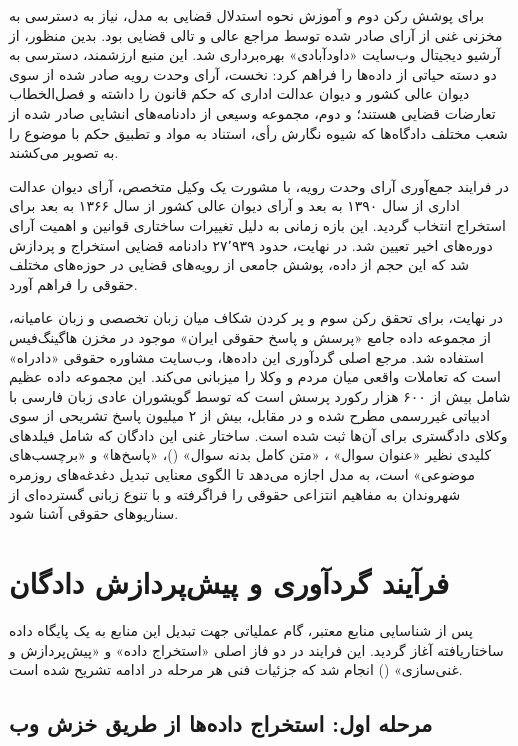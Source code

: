 \documentclass[12pt,a4paper]{report}
\begin{document}
	برای پوشش رکن دوم و آموزش نحوه استدلال قضایی به مدل، نیاز به دسترسی به مخزنی غنی از آرای صادر شده توسط مراجع عالی و تالی قضایی بود. بدین منظور، از آرشیو دیجیتال وب‌سایت «داودآبادی» بهره‌برداری شد. این منبع ارزشمند، دسترسی به دو دسته حیاتی از داده‌ها را فراهم کرد: نخست، آرای وحدت رویه صادر شده از سوی دیوان عالی کشور و دیوان عدالت اداری که حکم قانون را داشته و فصل‌الخطاب تعارضات قضایی هستند؛ و دوم، مجموعه وسیعی از دادنامه‌های انشایی صادر شده از شعب مختلف دادگاه‌ها که شیوه نگارش رأی، استناد به مواد و تطبیق حکم با موضوع را به تصویر می‌کشند.
	
	در فرایند جمع‌آوری آرای وحدت رویه، با مشورت یک وکیل متخصص، آرای دیوان عدالت اداری از سال ۱۳۹۰ به بعد و آرای دیوان عالی کشور از سال ۱۳۶۶ به بعد برای استخراج انتخاب گردید. این بازه زمانی به دلیل تغییرات ساختاری قوانین و اهمیت آرای دوره‌های اخیر تعیین شد. در نهایت، حدود ۲۷٬۹۳۹ دادنامه قضایی استخراج و پردازش شد که این حجم از داده، پوشش جامعی از رویه‌های قضایی در حوزه‌های مختلف حقوقی را فراهم آورد.
	
	در نهایت، برای تحقق رکن سوم و پر کردن شکاف میان زبان تخصصی و زبان عامیانه، از مجموعه داده جامع «پرسش و پاسخ حقوقی ایران»  موجود در مخزن هاگینگ‌فیس استفاده شد. مرجع اصلی گردآوری این داده‌ها، وب‌سایت مشاوره حقوقی «دادراه» است که تعاملات واقعی میان مردم و وکلا را میزبانی می‌کند. این مجموعه داده عظیم شامل بیش از ۶۰۰ هزار رکورد پرسش است که توسط گویشوران عادی زبان فارسی با ادبیاتی غیررسمی مطرح شده و در مقابل، بیش از ۲ میلیون پاسخ تشریحی از سوی وکلای دادگستری برای آن‌ها ثبت شده است. ساختار غنی این دادگان که شامل فیلدهای کلیدی نظیر «عنوان سوال» ، «متن کامل بدنه سوال» ()، «پاسخ‌ها»  و «برچسب‌های موضوعی»  است، به مدل اجازه می‌دهد تا الگوی معنایی تبدیل دغدغه‌های روزمره شهروندان به مفاهیم انتزاعی حقوقی را فراگرفته و با تنوع زبانی گسترده‌ای از سناریوهای حقوقی آشنا شود.
	
	\section{فرآیند گردآوری و پیش‌پردازش دادگان}
	
	پس از شناسایی منابع معتبر، گام عملیاتی جهت تبدیل این منابع به یک پایگاه داده ساختاریافته آغاز گردید. این فرایند در دو فاز اصلی «استخراج داده»  و «پیش‌پردازش و غنی‌سازی» () انجام شد که جزئیات فنی هر مرحله در ادامه تشریح شده است.
	
	\subsection{مرحله اول: استخراج داده‌ها از طریق خزش وب}
	
\end{document}
